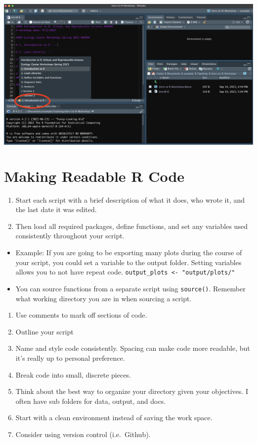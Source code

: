 \documentclass[
]{book}
\providecommand{\tightlist}{%
  \setlength{\itemsep}{0pt}\setlength{\parskip}{0pt}}
\begin{document}
\includegraphics{./docs/files/bookmarks.png}

\section{Making Readable R Code}\label{making-readable-r-code-1}

\begin{enumerate}
\def\labelenumi{\arabic{enumi})}
\tightlist
\item
  Start each script with a brief description of what it does, who wrote it, and the last date it was edited.
\item
  Then load all required packages, define functions, and set any variables used consistently throughout your script.
\end{enumerate}

\begin{itemize}
\tightlist
\item
  Example: If you are going to be exporting many plots during the course of your script, you could set a variable to the output folder. Setting variables allows you to not have repeat code.
  \texttt{output\_plots\ \textless{}-\ "output/plots/"}
\item
  You can source functions from a separate script using \texttt{source()}. Remember what working directory you are in when sourcing a script.
\end{itemize}

\begin{enumerate}
\def\labelenumi{\arabic{enumi})}
\setcounter{enumi}{3}
\tightlist
\item
  Use comments to mark off sections of code.
\item
  Outline your script
\item
  Name and style code consistently. Spacing can make code more readable, but it's really up to personal preference.
\item
  Break code into small, discrete pieces.
\item
  Think about the best way to organize your directory given your objectives. I often have sub folders for data, output, and docs.
\item
  Start with a clean environment instead of saving the work space.
\item
  Consider using version control (i.e.~Github).
\end{enumerate}

  
\end{document}
